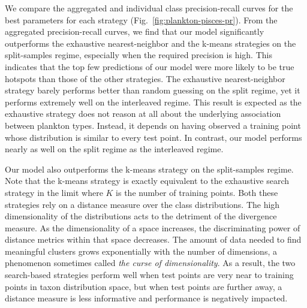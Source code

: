 We compare the aggregated and individual class precision-recall curves for the best parameters for each strategy (Fig.~\ref{fig:plankton-pisces-pr}). From the aggregated precision-recall curves, we find that our model significantly outperforms the exhaustive nearest-neighbor and the k-means strategies on the split-samples regime, especially when the required precision is high. This indicates that the top few predictions of our model were more likely to be true hotspots than those of the other strategies. The exhaustive nearest-neighbor strategy barely performs better than random guessing on the split regime, yet it performs extremely well on the interleaved regime. This result is expected as the exhaustive strategy does not reason at all about the underlying association between plankton types. Instead, it depends on having observed a training point whose distribution is similar to every test point. In contrast, our model performs nearly as well on the split regime as the interleaved regime.

Our model also outperforms the k-means strategy on the split-samples regime. Note that the k-means strategy is exactly equivalent to the exhaustive search strategy in the limit where $K$ is the number of training points. Both these strategies rely on a distance measure over the class distributions. The high dimensionality of the distributions acts to the detriment of the divergence measure. As the dimensionality of a space increases, the discriminating power of distance metrics within that space decreases. The amount of data needed to find meaningful clusters grows exponentially with the number of dimensions, a phenomenon sometimes called \textit{the curse of dimensionality}. As a result, the two search-based strategies perform well when test points are very near to training points in taxon distribution space, but when test points are further away, a distance measure is less informative and performance is negatively impacted.

